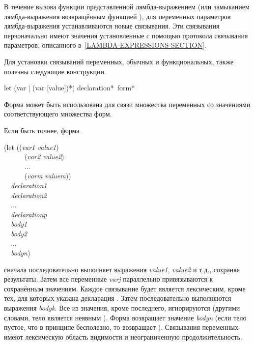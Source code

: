 В течение вызова функции представленной лямбда-выражением (или замыканием
лямбда-выражения возвращённым функцией ),
для переменных параметров лямбда-выражения устанавливаются новые связывания. Эти
связывания первоначально имеют значения установленные с помощью протокола
связывания параметров, описанного в~\ref{LAMBDA-EXPRESSIONS-SECTION}.

Для установки связываний переменных, обычных и функциональных, также полезны
следующие конструкции.

\begin{defspec}
let ({var | (var [value])}*) {declaration}* {\,form}*

Форма  может быть использована для связи множества переменных со
значениями соответствующего множества форм.

Если быть точнее, форма
\begin{lisp}
(let ((\emph{var1} \emph{value1}) \\
~~~~~~(\emph{var2} \emph{value2}) \\
~~~~~~... \\
~~~~~~(\emph{varm} \emph{valuem})) \\
~~\emph{declaration1} \\
~~\emph{declaration2} \\
~~... \\
~~\emph{declarationp} \\
~~\emph{body1} \\
~~\emph{body2} \\
~~... \\
~~\emph{bodyn})
\end{lisp}
сначала последовательно выполняет выражения \emph{value1}, \emph{value2} и т.д.,
сохраняя результаты.
Затем все переменные \emph{varj} параллельно привязываются к сохранённым
значениям. Каждое связывание будет является лексическим, кроме тех, для которых
указана декларация .
Затем последовательно выполняются выражения \emph{bodyk}. Все из значения, кроме
последнего, игнорируются (другими словами, тело  является неявным
).
Форма  возвращает значение \emph{bodyn} (если тело пустое, что в
принципе бесполезно, то  возвращает {\false}).
Связывания переменных имеют лексическую область видимости и неограниченную
продолжительность.


\end{defspec}
